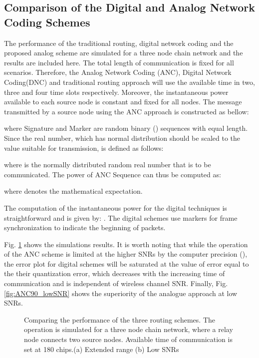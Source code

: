 \documentclass[conference]{IEEEtran}
\begin{document}
\subsection{Comparison of the Digital and Analog Network Coding Schemes}\label{sim:comparison}
The performance of the traditional routing, digital network coding and the proposed analog scheme are simulated for a three node chain network and the results are included here. The total length of communication is fixed for all scenarios. Therefore, the Analog Network Coding (ANC), Digital Network Coding(DNC) and traditional routing approach will use the available time in two, three and four time slots respectively. Moreover, the instantaneous power available to each source node is constant and fixed for all nodes. The message transmitted by a source node using the ANC approach is constructed as bellow: 

where Signature and Marker are random binary () sequences with equal length. Since the real number, which has normal distribution should be scaled to the value suitable for transmission,  is defined as follows:

where  is the normally distributed random real number that is to be communicated.
The power of ANC Sequence can thus be computed as:

where  denotes the mathematical expectation.

The computation of the instantaneous power for the digital techniques is straightforward and is given by: . The digital schemes use markers for frame synchronization to indicate the beginning of packets.

Fig. \ref{fig:digitalAnalogCompare} shows the simulations results. It is worth noting that while the operation of the ANC scheme is limited at the higher SNRs by the computer precision (), the error plot for digital schemes will be saturated at the value of error equal to the their quantization error, which decreases with the increasing time of communication and is independent of wireless channel SNR. Finally, Fig. \ref{fig:ANC90_lowSNR} shows the superiority of the analogue approach at low SNRs. 

\begin{figure}[tp]
     \centering

     
\caption{Comparing the performance of the three routing schemes. The operation is simulated for a three node chain network, where a relay node connects two source nodes. Available time of communication is set at 180 chips.(a) Extended range (b) Low SNRs}

\label{fig:digitalAnalogCompare}
\end{figure}
\end{document}

